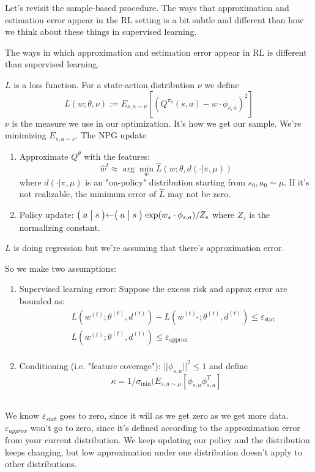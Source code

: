 \documentclass[12pt,reqno]{amsart}
\newcommand{\Cond}[2]{\bigm( {#1} \bigm\vert {#2}\bigm)}
\newcommand{\smcond}[2]{( {#1} \vert {#2})}
\newcommand\eps{\varepsilon}
\begin{document}
Let's revisit the sample-based procedure. The ways that approximation and estimation error appear in the RL setting is a bit subtle and different than how we think about these things in supervised learning. 

The ways in which approximation and estimation error appear in RL is different than supervised learning.

$L$ is a loss function. For a state-action distribution $\nu$ we define
\begin{equation}
L(w;\theta,\nu) := E_{s,a \sim \nu}\left[ (Q^{\pi_\theta}(s,a) -w \cdot \phi_{s,a})^2 \right]
\end{equation}
$\nu$ is the measure we use in our optimization. It's how we get our sample. We're minimizing $E_{s,a \sim \nu}$.
The NPG update 
\begin{enumerate}
\item Approximate $Q^\theta$ with the features:
\begin{equation}
\hat{w}^t \approx \arg \min_w \hat{L}(w; \theta, d\smcond{\cdot}{\pi,\mu})
\end{equation}
where $d\smcond{\cdot}{\pi,\mu}$ is an "on-policy" distribution starting from $s_0, a_0 \sim \mu$. If it's not realizable, the minimum error of $\hat{L}$ may not be zero.\\
\item Policy update: $\Cond{a}{s} \leftarrow \Cond{a}{s}\exp(w_\star \cdot \phi_{s,a}) /Z_s$ where $Z_s$ is the normalizing constant.\\
\end{enumerate}
$L$ is doing regression but we're assuming that there's approximation error.

So we make two assumptions: 
\begin{enumerate}
\item Supervised learning error: Suppose the excess risk and approx error are bounded as: 
\begin{eqnarray}
&& L(w^{(t)}; \theta^{(t)}, d^{(t)}) - L(w^{(t)_\star}; \theta^{(t)}, d^{(t)}) \leq \eps_{\textrm{stat}} \\
&& L(w^{(t)}; \theta^{(t)}, d^{(t)}) \leq \eps_{\textrm{approx}}\\
\end{eqnarray} 
\item Conditioning (i.e. "feature coverage"): $||\phi_{s,a}||^{2} \leq 1$ and define
\begin{equation}
\kappa = 1/ \sigma_{\min} (E_{s,a\sim \mu} \left[ \phi_{s,a} \phi_{s,a}^{T} \right]
\end{equation}\\
\end{enumerate}
We know $\eps_{stat}$ goes to zero, since it will as we get zero as we get more data. $\eps_{approx}$ won't go to zero, since it's defined according to the approximation error from your current distribution. We keep updating our policy and the distribution keeps changing, but low approximation under one distribution doesn't apply to other distributions.
\end{document}
